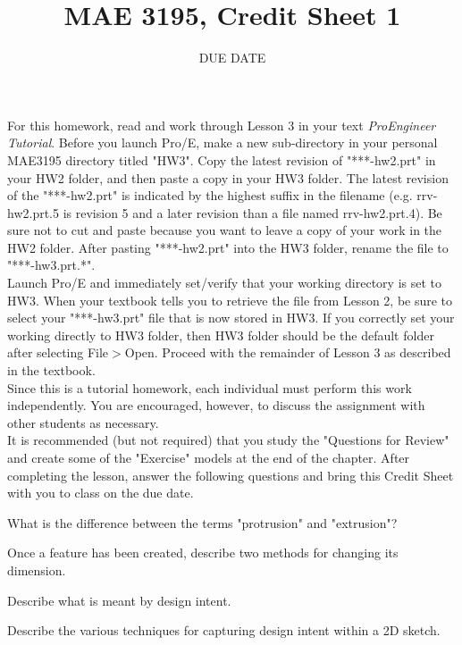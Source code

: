 \documentclass{homework}
\title{MAE 3195, Credit Sheet 1}
\author{DUE DATE}
\begin{document}
For this homework, read and work through Lesson 3 in your text \textit{ProEngineer Tutorial}. Before you launch Pro/E, make a new sub-directory in your personal MAE3195 directory titled "HW3". Copy the latest revision of "***-hw2.prt" in your HW2 folder, and then paste a copy in your HW3 folder. The latest revision of the "***-hw2.prt" is indicated by the highest suffix in the filename (e.g. rrv-hw2.prt.5 is revision 5 and a later revision than a file named rrv-hw2.prt.4). Be sure not to cut and paste because you want to leave a copy of your work in the HW2 folder. After pasting "***-hw2.prt" into the HW3 folder, rename the file to "***-hw3.prt.*".\\

Launch Pro/E and immediately set/verify that your working directory is set to HW3. When your textbook tells you to retrieve the file from Lesson 2, be sure to select your "***-hw3.prt" file that is now stored in HW3. If you correctly set your working directly to HW3 folder, then HW3 folder should be the default folder after selecting File$>$Open. Proceed with the remainder of Lesson 3 as described in the textbook.\\

Since this is a tutorial homework, each individual must perform this work independently. You are encouraged, however, to discuss the assignment with other students as necessary.\\

It is recommended (but not required) that you study the "Questions for Review" and create some of the "Exercise" models at the end of the chapter. After completing the lesson, answer the following questions and bring this Credit Sheet with you to class on the due date.

\problem{} What is the difference between the terms "protrusion" and "extrusion"?
\solution

\problem{} Once a feature has been created, describe two methods for changing its dimension.
\solution

\problem{} Describe what is meant by design intent.
\solution

\problem{} Describe the various techniques for capturing design intent within a 2D sketch.
\solution

\problem{} 
\solutions
\end{document}
